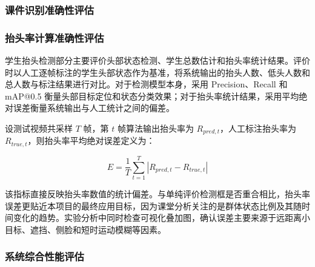 \documentclass[12pt,hyperref,a4paper,UTF8]{ctexart}
\begin{document}
\subsubsection{课件识别准确性评估}



\subsubsection{抬头率计算准确性评估}

学生抬头检测部分主要评价头部状态检测、学生总数估计和抬头率统计结果。评价时以人工逐帧标注的学生头部状态作为基准，将系统输出的抬头人数、低头人数和总人数与标注结果进行对比。对于检测模型本身，采用 Precision、Recall 和 mAP@0.5 衡量头部目标定位和状态分类效果；对于抬头率统计结果，采用平均绝对误差衡量系统输出与人工统计之间的偏差。

设测试视频共采样 $T$ 帧，第 $t$ 帧算法输出抬头率为 $R_{pred,t}$，人工标注抬头率为 $R_{true,t}$，则抬头率平均绝对误差定义为：

\[
E = \frac{1}{T} \sum_{t=1}^{T} \left|R_{pred,t} - R_{true,t}\right|
\]

该指标直接反映抬头率数值的统计偏差。与单纯评价检测框是否重合相比，抬头率误差更贴近本项目的最终应用目标，因为课堂分析关注的是群体状态比例及其随时间变化的趋势。实验分析中同时检查可视化叠加图，确认误差主要来源于远距离小目标、遮挡、侧脸和短时运动模糊等因素。

\subsubsection{系统综合性能评估}

\end{document}
